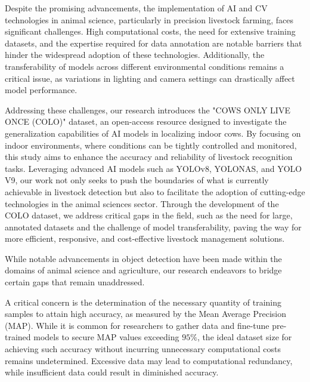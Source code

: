 Despite the promising advancements, the implementation of AI and CV technologies in animal science, particularly in precision livestock farming, faces significant challenges. High computational costs, the need for extensive training datasets, and the expertise required for data annotation are notable barriers that hinder the widespread adoption of these technologies. Additionally, the transferability of models across different environmental conditions remains a critical issue, as variations in lighting and camera settings can drastically affect model performance.

Addressing these challenges, our research introduces the "COWS ONLY LIVE ONCE (COLO)" dataset, an open-access resource designed to investigate the generalization capabilities of AI models in localizing indoor cows. By focusing on indoor environments, where conditions can be tightly controlled and monitored, this study aims to enhance the accuracy and reliability of livestock recognition tasks. Leveraging advanced AI models such as YOLOv8, YOLONAS, and YOLO V9, our work not only seeks to push the boundaries of what is currently achievable in livestock detection but also to facilitate the adoption of cutting-edge technologies in the animal sciences sector. Through the development of the COLO dataset, we address critical gaps in the field, such as the need for large, annotated datasets and the challenge of model transferability, paving the way for more efficient, responsive, and cost-effective livestock management solutions.


While notable advancements in object detection have been made within the domains of animal science and agriculture, our research endeavors to bridge certain gaps that remain unaddressed.

A critical concern is the determination of the necessary quantity of training samples to attain high accuracy, as measured by the Mean Average Precision (MAP). While it is common for researchers to gather data and fine-tune pre-trained models to secure MAP values exceeding $95\%$, the ideal dataset size for achieving such accuracy without incurring unnecessary computational costs remains undetermined. Excessive data may lead to computational redundancy, while insufficient data could result in diminished accuracy.

